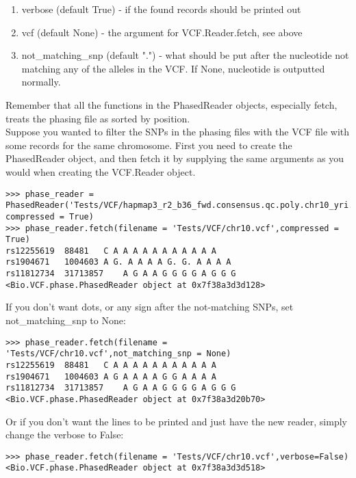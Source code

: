 \begin{enumerate}
  \item verbose (default True) - if the found records should be printed out
  \item vcf (default None) - the argument for VCF.Reader.fetch, see above
  \item not\_matching\_snp (default ".") - what should be put after the nucleotide not matching any of the alleles in the VCF.
  If None, nucleotide is outputted normally.
\end{enumerate}

\noindent Remember that all the functions in the PhasedReader objects, especially fetch, treats the phasing file as sorted by position.
\\

\noindent Suppose you wanted to filter the SNPs in the phasing files with the VCF file with some records for the same chromosome.
First you need to create the PhasedReader object, and then fetch it by supplying the same arguments as you would when creating the VCF.Reader object.

\begin{verbatim}
>>> phase_reader = PhasedReader('Tests/VCF/hapmap3_r2_b36_fwd.consensus.qc.poly.chr10_yri.D.phased.gz',
compressed = True)
>>> phase_reader.fetch(filename = 'Tests/VCF/chr10.vcf',compressed = True)
rs12255619	88481	C A A A A A A A A A A A
rs1904671	1004603	A G. A A A A G. G. A A A A
rs11812734	31713857	A G A A G G G G A G G G
<Bio.VCF.phase.PhasedReader object at 0x7f38a3d3d128>
\end{verbatim}

\noindent If you don't want dots, or any sign after the not-matching SNPs, set not\_matching\_snp to None:

\begin{verbatim}
>>> phase_reader.fetch(filename = 'Tests/VCF/chr10.vcf',not_matching_snp = None)
rs12255619	88481	C A A A A A A A A A A A
rs1904671	1004603	A G A A A A G G A A A A
rs11812734	31713857	A G A A G G G G A G G G
<Bio.VCF.phase.PhasedReader object at 0x7f38a3d20b70>
\end{verbatim}

\noindent Or if you don't want the lines to be printed and just have the new reader, simply change the verbose to False:

\begin{verbatim}
>>> phase_reader.fetch(filename = 'Tests/VCF/chr10.vcf',verbose=False)
<Bio.VCF.phase.PhasedReader object at 0x7f38a3d3d518>
\end{verbatim}

